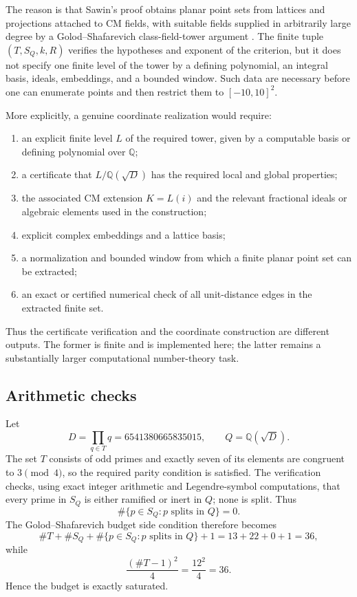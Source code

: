 \documentclass[a4paper,12pt]{article}
\begin{document}
The reason is that Sawin's proof obtains planar point sets from lattices and projections attached to CM fields, with suitable fields supplied in arbitrarily large degree by a Golod--Shafarevich class-field-tower argument \cite{Sawin2026}.  The finite tuple $(T,S_Q,k,R)$ verifies the hypotheses and exponent of the criterion, but it does not specify one finite level of the tower by a defining polynomial, an integral basis, ideals, embeddings, and a bounded window.  Such data are necessary before one can enumerate points and then restrict them to $[-10,10]^2$.

More explicitly, a genuine coordinate realization would require:
\begin{enumerate}
\item an explicit finite level $L$ of the required tower, given by a computable basis or defining polynomial over $\mathbb Q$;
\item a certificate that $L/\mathbb Q(\sqrt D)$ has the required local and global properties;
\item the associated CM extension $K=L(i)$ and the relevant fractional ideals or algebraic elements used in the construction;
\item explicit complex embeddings and a lattice basis;
\item a normalization and bounded window from which a finite planar point set can be extracted;
\item an exact or certified numerical check of all unit-distance edges in the extracted finite set.
\end{enumerate}
Thus the certificate verification and the coordinate construction are different outputs.  The former is finite and is implemented here; the latter remains a substantially larger computational number-theory task.

\subsection*{Arithmetic checks}

Let
\[
D=\prod_{q\in T}q=6541380665835015,
\qquad
Q=\mathbb{Q}(\sqrt D).
\]
The set $T$ consists of odd primes and exactly seven of its elements are congruent to $3\pmod 4$, so the required parity condition is satisfied.  The verification checks, using exact integer arithmetic and Legendre-symbol computations, that every prime in $S_Q$ is either ramified or inert in $Q$; none is split.  Thus
\[
\#\{p\in S_Q:p\text{ splits in }Q\}=0.
\]
The Golod--Shafarevich budget side condition therefore becomes
\[
\#T+\#S_Q+\#\{p\in S_Q:p\text{ splits in }Q\}+1
=13+22+0+1=36,
\]
while
\[
\frac{(\#T-1)^2}{4}=\frac{12^2}{4}=36.
\]
Hence the budget is exactly saturated.
\end{document}
